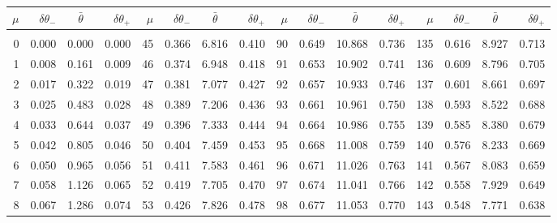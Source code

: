 \clearpage
\begin{table}[!h]\centering
\vspace{0.25cm}
\scriptsize{ 
\begin{tabular}{rrrr|rrrr|rrrr|rrrr}
$\mu$ & $\delta\theta_-$  & $\bar{\theta}~~~~$ & $\delta\theta_+$ &
$\mu$ & $\delta\theta_-$  & $\bar{\theta}~~~~$ & $\delta\theta_+$ &
$\mu$ & $\delta\theta_-$  & $\bar{\theta}~~~~$ & $\delta\theta_+$ &
$\mu$ & $\delta\theta_-$  & $\bar{\theta}~~~~$ & $\delta\theta_+$ \\\hline
&&&&&&&&&&&&&&&\\[-1.75ex]
  0 & \tiny{  0.000} &   0.000 & \tiny{  0.000} &  45 & \tiny{  0.366} &   6.816 & \tiny{  0.410} &  90 & \tiny{  0.649} &  10.868 & \tiny{  0.736} & 135 & \tiny{  0.616} &   8.927 & \tiny{  0.713}\\
  1 & \tiny{  0.008} &   0.161 & \tiny{  0.009} &  46 & \tiny{  0.374} &   6.948 & \tiny{  0.418} &  91 & \tiny{  0.653} &  10.902 & \tiny{  0.741} & 136 & \tiny{  0.609} &   8.796 & \tiny{  0.705}\\
  2 & \tiny{  0.017} &   0.322 & \tiny{  0.019} &  47 & \tiny{  0.381} &   7.077 & \tiny{  0.427} &  92 & \tiny{  0.657} &  10.933 & \tiny{  0.746} & 137 & \tiny{  0.601} &   8.661 & \tiny{  0.697}\\
  3 & \tiny{  0.025} &   0.483 & \tiny{  0.028} &  48 & \tiny{  0.389} &   7.206 & \tiny{  0.436} &  93 & \tiny{  0.661} &  10.961 & \tiny{  0.750} & 138 & \tiny{  0.593} &   8.522 & \tiny{  0.688}\\
  4 & \tiny{  0.033} &   0.644 & \tiny{  0.037} &  49 & \tiny{  0.396} &   7.333 & \tiny{  0.444} &  94 & \tiny{  0.664} &  10.986 & \tiny{  0.755} & 139 & \tiny{  0.585} &   8.380 & \tiny{  0.679}\\
  5 & \tiny{  0.042} &   0.805 & \tiny{  0.046} &  50 & \tiny{  0.404} &   7.459 & \tiny{  0.453} &  95 & \tiny{  0.668} &  11.008 & \tiny{  0.759} & 140 & \tiny{  0.576} &   8.233 & \tiny{  0.669}\\
  6 & \tiny{  0.050} &   0.965 & \tiny{  0.056} &  51 & \tiny{  0.411} &   7.583 & \tiny{  0.461} &  96 & \tiny{  0.671} &  11.026 & \tiny{  0.763} & 141 & \tiny{  0.567} &   8.083 & \tiny{  0.659}\\
  7 & \tiny{  0.058} &   1.126 & \tiny{  0.065} &  52 & \tiny{  0.419} &   7.705 & \tiny{  0.470} &  97 & \tiny{  0.674} &  11.041 & \tiny{  0.766} & 142 & \tiny{  0.558} &   7.929 & \tiny{  0.649}\\
  8 & \tiny{  0.067} &   1.286 & \tiny{  0.074} &  53 & \tiny{  0.426} &   7.826 & \tiny{  0.478} &  98 & \tiny{  0.677} &  11.053 & \tiny{  0.770} & 143 & \tiny{  0.548} &   7.771 & \tiny{  0.638}\\

\end{tabular}}
\end{table}

